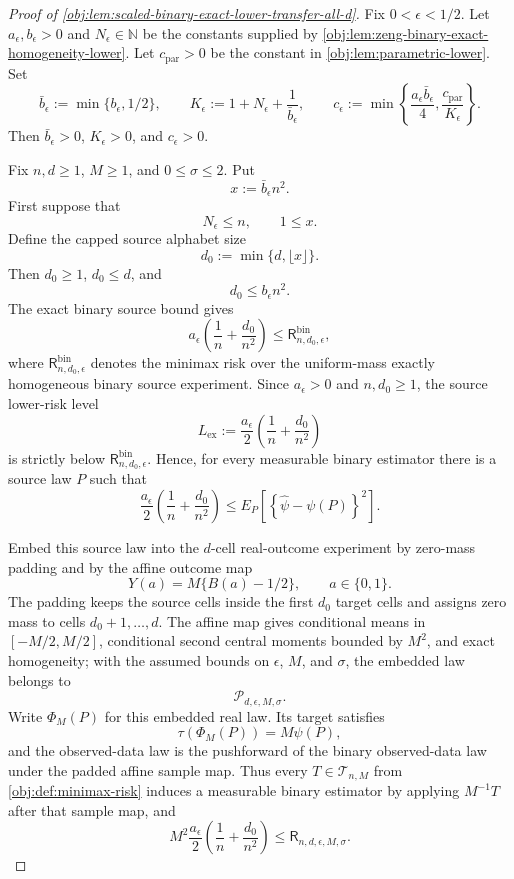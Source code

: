 \documentclass[11pt]{article}
\begin{document}
\begin{proof}[Proof of \cref{obj:lem:scaled-binary-exact-lower-transfer-all-d}]
Fix \(0<\epsilon<1/2\).  Let \(a_\epsilon,b_\epsilon>0\) and
\(N_\epsilon\in\mathbb N\) be the constants supplied by
\cref{obj:lem:zeng-binary-exact-homogeneity-lower}.  Let
\(c_{\mathrm{par}}>0\) be the constant in \cref{obj:lem:parametric-lower}.
Set
\[
\bar b_\epsilon:=\min\{b_\epsilon,1/2\},
\qquad
K_\epsilon:=1+N_\epsilon+\frac1{\bar b_\epsilon},
\qquad
c_\epsilon:=\min\left\{\frac{a_\epsilon \bar b_\epsilon}{4},
\frac{c_{\mathrm{par}}}{K_\epsilon}\right\}.
\]
Then \(\bar b_\epsilon>0\), \(K_\epsilon>0\), and \(c_\epsilon>0\). %

Fix \(n,d\ge1\), \(M\ge1\), and \(0\le\sigma\le2\).  Put
\[
x:=\bar b_\epsilon n^2 .
\]
First suppose that
\[
N_\epsilon\le n,
\qquad
1\le x .
\]
Define the capped source alphabet size
\[
d_0:=\min\{d,\lfloor x\rfloor\}.
\]
Then \(d_0\ge1\), \(d_0\le d\), and
\[
d_0\le b_\epsilon n^2 .
\] %
The exact binary source bound gives
\[
a_\epsilon\left(\frac1n+\frac{d_0}{n^2}\right)
\le
\mathsf R^{\mathrm{bin}}_{n,d_0,\epsilon},
\]
where \(\mathsf R^{\mathrm{bin}}_{n,d_0,\epsilon}\) denotes the minimax risk over the uniform-mass exactly homogeneous binary source experiment. %
Since \(a_\epsilon>0\) and \(n,d_0\ge1\), the source lower-risk level
\[
L_{\mathrm{ex}}:=\frac{a_\epsilon}{2}
\left(\frac1n+\frac{d_0}{n^2}\right)
\]
is strictly below \(\mathsf R^{\mathrm{bin}}_{n,d_0,\epsilon}\).  Hence, for every measurable binary estimator there is a source law \(P\) such that
\[
\frac{a_\epsilon}{2}
\left(\frac1n+\frac{d_0}{n^2}\right)
\le
E_P\left[
\left\{\widehat\psi-\psi(P)\right\}^2
\right].
\] %

Embed this source law into the \(d\)-cell real-outcome experiment by zero-mass padding and by the affine outcome map
\[
Y(a)=M\{B(a)-1/2\},\qquad a\in\{0,1\}.
\]
The padding keeps the source cells inside the first \(d_0\) target cells and assigns zero mass to cells \(d_0+1,\ldots,d\).  The affine map gives conditional means in \([-M/2,M/2]\), conditional second central moments bounded by \(M^2\), and exact homogeneity; with the assumed bounds on \(\epsilon\), \(M\), and \(\sigma\), the embedded law belongs to
\[
\mathcal P_{d,\epsilon,M,\sigma}.
\] %
Write \(\Phi_M(P)\) for this embedded real law.  Its target satisfies
\[
\tau(\Phi_M(P))=M\psi(P),
\]
and the observed-data law is the pushforward of the binary observed-data law under the padded affine sample map.  Thus every \(T\in\mathcal T_{n,M}\) from \cref{obj:def:minimax-risk} induces a measurable binary estimator by applying \(M^{-1}T\) after that sample map, and
\[
M^2\frac{a_\epsilon}{2}
\left(\frac1n+\frac{d_0}{n^2}\right)
\le
\mathsf R_{n,d,\epsilon,M,\sigma}.
\] %


\end{proof}
\end{document}
